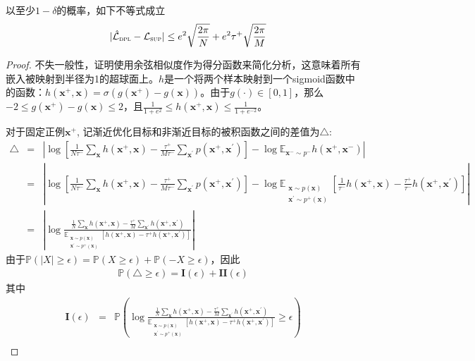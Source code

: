 \begin{lemma}\label{lemma:err}
以至少$1-\delta$的概率，如下不等式成立
	\begin{eqnarray}
		&&|\hat{\mathcal{L}}_\textsc{dpl}-\mathcal{L}_\textsc{sup}| \leq \nonumber e^2\sqrt{\frac{2\pi}{N}} + e^2\tau^+\sqrt{\frac{2\pi}{M}}
	\end{eqnarray}
	\begin{proof}
不失一般性，证明使用余弦相似度作为得分函数来简化分析，这意味着所有嵌入被映射到半径为1的超球面上。$h$是一个将两个样本映射到一个sigmoid函数中的函数：$h(\mathbf{x}^+,\mathbf{x}) = \sigma (g(\mathbf{x}^+)- g(\mathbf{x}))$。由于$g(\cdot) \in [0,1]$，那么$-2 \leq g(\mathbf{x}^+)- g(\mathbf{x}) \leq 2$，且$ \frac{1}{1+e^{2}} \leq h(\mathbf{x}^+,\mathbf{x}) \leq \frac{1}{1+e^{-2}} $。	
		
对于固定正例$\mathbf{x}^+$, 记渐近优化目标和非渐近目标的被积函数之间的差值为$\triangle$:
		\begin{eqnarray}
			\triangle &=& | \log [ \frac{1}{N\tau^-}  \sum_{\mathbf{x}} h(\mathbf{x}^+,\mathbf{x})  -\frac{\tau^+}{M\tau^-} \sum_{\mathbf{x}^\prime} p(\mathbf{x}^+,\mathbf{x}^\prime)]  - \log\mathbb{E}_{\mathbf{x}^-\sim p^-}h(\mathbf{x}^+,\mathbf{x}^-)|\nonumber \\
			&=&| \log [ \frac{1}{N\tau^-}  \sum_{\mathbf{x}} h(\mathbf{x}^+,\mathbf{x})  -\frac{\tau^+}{M\tau^-} \sum_{\mathbf{x}^\prime} p(\mathbf{x}^+,\mathbf{x}^\prime)]  - \log\mathbb{E}_{\substack{\mathbf x \sim p(\mathbf x) \\ \mathbf x^\prime \sim p^+(\mathbf x)}} [ \frac{1}{\tau^-}h(\mathbf{x}^+,\mathbf{x}) - \frac{\tau^+}{\tau^-}h(\mathbf{x}^+,\mathbf{x}^\prime)]| \nonumber\\
			&=& | \log \frac{\frac{1}{N}  \sum_{\mathbf{x}} h(\mathbf{x}^+,\mathbf{x})  -\frac{\tau^+}{M} \sum_{\mathbf{x}^\prime} h(\mathbf{x}^+,\mathbf{x}^\prime)}{\mathbb{E}_{\substack{\mathbf x \sim p(\mathbf x) \\ \mathbf x^\prime \sim p^+(\mathbf x)}} [ h(\mathbf{x}^+,\mathbf{x}) - \tau^+h(\mathbf{x}^+,\mathbf{x}^\prime)]} | \nonumber
		\end{eqnarray}
由于$\mathbb{P}(|X|\geq \epsilon )=\mathbb{P}(X\geq \epsilon )+\mathbb{P}(-X\geq \epsilon )$，因此
		\begin{eqnarray}
			\mathbb{P}(\triangle \geq \epsilon) = \mathbf{I}(\epsilon) + \mathbf{II}(\epsilon) 
		\end{eqnarray}
其中
		\begin{eqnarray}
			\mathbf{I}(\epsilon) 
			&=& \mathbb{P} \left(\log \frac{\frac{1}{N}  \sum_{\mathbf{x}} h(\mathbf{x}^+,\mathbf{x})  -\frac{\tau^+}{M} \sum_{\mathbf{x}^\prime} h(\mathbf{x}^+,\mathbf{x}^\prime)}{\mathbb{E}_{\substack{\mathbf x \sim p(\mathbf x) \\ \mathbf x^\prime \sim p^+(\mathbf x)}} [ h(\mathbf{x}^+,\mathbf{x}) - \tau^+h(\mathbf{x}^+,\mathbf{x}^\prime)]} \geq \epsilon  \right) \\

\end{eqnarray}
\end{proof}
\end{lemma}

